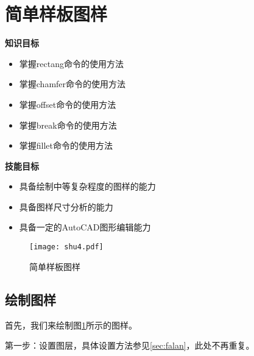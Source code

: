 \section{简单样板图样}\label{sec:yangban}
{\bfseries 知识目标}
\begin{itemize}
\item 掌握rectang命令的使用方法
\item 掌握chamfer命令的使用方法
\item 掌握offset命令的使用方法
\item 掌握break命令的使用方法
\item 掌握fillet命令的使用方法
\end{itemize}

{\bfseries 技能目标}
\begin{itemize}
\item 具备绘制中等复杂程度的图样的能力
\item 具备图样尺寸分析的能力
\item 具备一定的AutoCAD图形编辑能力
\end{itemize}
\begin{figure}[htbp]
\centering
\texttt{[image: shu4.pdf]}
\caption{简单样板图样}\label{fig:renwu3}
\end{figure}
\subsection{绘制图样}
首先，我们来绘制图\ref{fig:renwu3}所示的图样。

第一步：设置图层，具体设置方法参见\ref{sec:falan}，此处不再重复。

